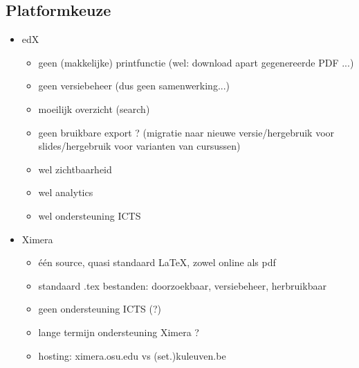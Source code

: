 \documentclass{ximera}
\begin{document}
 \subsection{Platformkeuze}\label{platformkeuze}
\small
\begin{itemize}
    \item edX
    \begin{itemize}
        \item geen (makkelijke) printfunctie (wel: download apart gegenereerde PDF ...)
        \item geen versiebeheer (dus geen samenwerking...)
        \item moeilijk overzicht (search)
        \item geen bruikbare export ? (migratie naar nieuwe versie/hergebruik voor slides/hergebruik voor varianten van cursussen)
        \item wel zichtbaarheid
        \item wel analytics
        \item wel ondersteuning ICTS
    \end{itemize}
    \item Ximera
    \begin{itemize}
        \item één source, quasi standaard \LaTeX, zowel online als pdf
        \item standaard .tex bestanden: doorzoekbaar, versiebeheer, herbruikbaar
        \item geen ondersteuning ICTS (?)
        \item lange termijn ondersteuning Ximera ?
        \item hosting: ximera.osu.edu vs (set.)kuleuven.be
    \end{itemize}
\end{itemize}
\end{document}
